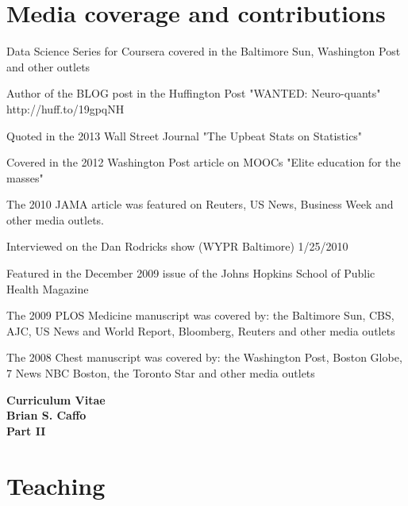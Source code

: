 \documentclass[12pt]{article}
\begin{document}
\section*{Media coverage and contributions}
\begin{description}
\item Data Science Series for Coursera covered in the Baltimore Sun, Washington Post and other outlets
\item Author of the BLOG post in the Huffington Post "WANTED: Neuro-quants" http://huff.to/19gpqNH
\item Quoted in the 2013 Wall Street Journal "The Upbeat Stats on Statistics"
\item Covered in the 2012 Washington Post article on MOOCs 
"Elite education for the masses"
\item The 2010 JAMA article was featured on Reuters, US
  News, Business Week and other media outlets.
\item Interviewed on the Dan Rodricks show (WYPR Baltimore) 1/25/2010
\item Featured in the December 2009 issue of the Johns Hopkins School of Public Health Magazine
\item The 2009 PLOS Medicine manuscript was covered by: the Baltimore
  Sun, CBS, AJC, US News and World Report, Bloomberg, Reuters and
  other media outlets
\item The 2008 Chest manuscript was covered by: the Washington Post,
  Boston Globe, 7 News NBC Boston, the Toronto Star and other media
  outlets
\end{description}


\begin{center}
\large
\bf Curriculum Vitae\\
 Brian S. Caffo \\ 
 Part II
\end{center}

\section*{Teaching}
\end{document}
